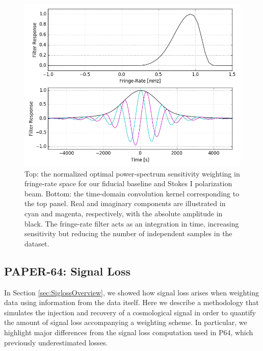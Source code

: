 \documentclass[preprint2,numberedappendix,tighten]{aastex6}  %
\begin{document}
\begin{figure}
	\centering
	\includegraphics[width=\columnwidth]{plots/frp.png}
	\caption{Top: the normalized optimal power-spectrum sensitivity weighting in fringe-rate space for our fiducial baseline and 
Stokes I polarization beam. Bottom: the time-domain convolution kernel corresponding to the top panel. Real and imaginary 
components are illustrated in cyan and magenta, respectively, with the absolute amplitude in black. The fringe-rate filter acts as 
an integration in time, increasing sensitivity but reducing the number of independent samples in the dataset.}
	\label{fig:frp}
\end{figure}


\subsection{PAPER-64: Signal Loss}
\label{sec:Sigloss}

In Section \ref{sec:SiglossOverview}, we showed how signal loss arises when weighting data using information from the data 
itself. Here we describe a methodology that simulates the injection and recovery of a cosmological signal in order to quantify 
the amount of signal loss accompanying a weighting scheme. In particular, we highlight major differences from the signal loss 
computation used in P64, which previously underestimated losses. 
\end{document}
